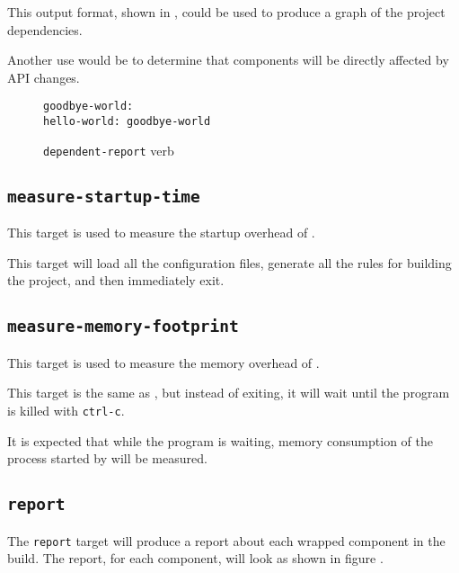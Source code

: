This output format, shown in ,
could be used to produce a graph of the project dependencies.

Another use would be to determine that components will be directly
affected by API changes.

\begin{figure}[tbh]
\hrulefill
\begin{verbatim}
goodbye-world:
hello-world: goodbye-world
\end{verbatim}
\hrulefill
\caption{\texttt{dependent-report} verb}\label{usinglmsbw:dependents-verb}
\end{figure}


\subsection{\texttt{measure-startup-time}}\label{usinglmsbw:measure-startup-time}

This target is used to measure the startup overhead of \lmsbw.

This target will load all the configuration files, generate all the
rules for building the project, and then immediately exit.

\subsection{\texttt{measure-memory-footprint}}

This target is used to measure the memory overhead of \lmsbw.

This target is the same as , but
instead of exiting, it will wait until the program is killed with
\texttt{ctrl-c}.

It is expected that while the program is waiting, memory consumption
of the \make process started by \lmsbw will be measured.

\subsection{\texttt{report}}\label{usinglmsbw:report}

The \texttt{report} target will produce a report about each wrapped
component in the build.  The report, for each component, will look
as shown in figure .

